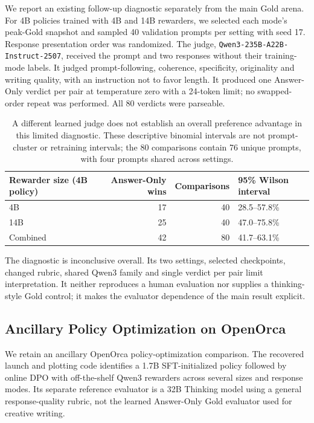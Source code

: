 \documentclass[11pt,letterpaper]{article}
\newcommand{\auditjudge}{\texttt{Qwen3-}\allowbreak\texttt{235B-}\allowbreak\texttt{A22B-}\allowbreak\texttt{Instruct-2507}}
\begin{document}
We report an existing follow-up diagnostic separately from the main Gold arena. For 4B policies trained with 4B and 14B rewarders, we selected each mode's peak-Gold snapshot and sampled 40 validation prompts per setting with seed 17. Response presentation order was randomized. The judge, \auditjudge{}, received the prompt and two responses without their training-mode labels. It judged prompt-following, coherence, specificity, originality and writing quality, with an instruction not to favor length. It produced one Answer-Only verdict per pair at temperature zero with a 24-token limit; no swapped-order repeat was performed. All 80 verdicts were parseable.

\begin{table}[ht]
\centering\small
\begin{tabular}{lrrl}
\toprule
Rewarder size (4B policy) & Answer-Only wins & Comparisons & 95\% Wilson interval \\
\midrule
4B & 17 & 40 & 28.5--57.8\% \\
14B & 25 & 40 & 47.0--75.8\% \\
Combined & 42 & 80 & 41.7--63.1\% \\
\bottomrule
\end{tabular}
\caption{A different learned judge does not establish an overall preference advantage in this limited diagnostic. These descriptive binomial intervals are not prompt-cluster or retraining intervals; the 80 comparisons contain 76 unique prompts, with four prompts shared across settings.}
\end{table}

The diagnostic is inconclusive overall. Its two settings, selected checkpoints, changed rubric, shared Qwen3 family and single verdict per pair limit interpretation. It neither reproduces a human evaluation nor supplies a thinking-style Gold control; it makes the evaluator dependence of the main result explicit.

\subsection{Ancillary Policy Optimization on OpenOrca}
\label{app:openorca}

We retain an ancillary OpenOrca policy-optimization comparison. The recovered launch and plotting code identifies a 1.7B SFT-initialized policy followed by online DPO with off-the-shelf Qwen3 rewarders across several sizes and response modes. Its separate reference evaluator is a 32B Thinking model using a general response-quality rubric, not the learned Answer-Only Gold evaluator used for creative writing.
\end{document}
